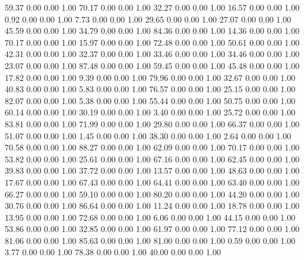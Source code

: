    59.37   0.00   0.00   1.00
   70.17   0.00   0.00   1.00
   32.27   0.00   0.00   1.00
   16.57   0.00   0.00   1.00
    0.92   0.00   0.00   1.00
    7.73   0.00   0.00   1.00
   29.65   0.00   0.00   1.00
   27.07   0.00   0.00   1.00
   45.59   0.00   0.00   1.00
   34.79   0.00   0.00   1.00
   84.36   0.00   0.00   1.00
   14.36   0.00   0.00   1.00
   70.17   0.00   0.00   1.00
   15.97   0.00   0.00   1.00
   72.48   0.00   0.00   1.00
   50.61   0.00   0.00   1.00
   42.31   0.00   0.00   1.00
   32.37   0.00   0.00   1.00
   33.46   0.00   0.00   1.00
   34.46   0.00   0.00   1.00
   23.07   0.00   0.00   1.00
   87.48   0.00   0.00   1.00
   59.45   0.00   0.00   1.00
   45.48   0.00   0.00   1.00
   17.82   0.00   0.00   1.00
    9.39   0.00   0.00   1.00
   79.96   0.00   0.00   1.00
   32.67   0.00   0.00   1.00
   40.83   0.00   0.00   1.00
    5.83   0.00   0.00   1.00
   76.57   0.00   0.00   1.00
   25.15   0.00   0.00   1.00
   82.07   0.00   0.00   1.00
    5.38   0.00   0.00   1.00
   55.44   0.00   0.00   1.00
   50.75   0.00   0.00   1.00
   60.14   0.00   0.00   1.00
   30.19   0.00   0.00   1.00
    3.40   0.00   0.00   1.00
   25.72   0.00   0.00   1.00
   83.81   0.00   0.00   1.00
   71.99   0.00   0.00   1.00
   29.80   0.00   0.00   1.00
   66.37   0.00   0.00   1.00
   51.07   0.00   0.00   1.00
    1.45   0.00   0.00   1.00
   38.30   0.00   0.00   1.00
    2.64   0.00   0.00   1.00
   70.58   0.00   0.00   1.00
   88.27   0.00   0.00   1.00
   62.09   0.00   0.00   1.00
   70.17   0.00   0.00   1.00
   53.82   0.00   0.00   1.00
   25.61   0.00   0.00   1.00
   67.16   0.00   0.00   1.00
   62.45   0.00   0.00   1.00
   39.83   0.00   0.00   1.00
   37.72   0.00   0.00   1.00
   13.57   0.00   0.00   1.00
   48.63   0.00   0.00   1.00
   17.67   0.00   0.00   1.00
   67.43   0.00   0.00   1.00
   64.41   0.00   0.00   1.00
   63.40   0.00   0.00   1.00
   66.27   0.00   0.00   1.00
   59.10   0.00   0.00   1.00
   80.20   0.00   0.00   1.00
   44.20   0.00   0.00   1.00
   30.76   0.00   0.00   1.00
   86.64   0.00   0.00   1.00
   11.24   0.00   0.00   1.00
   18.78   0.00   0.00   1.00
   13.95   0.00   0.00   1.00
   72.68   0.00   0.00   1.00
    6.06   0.00   0.00   1.00
   44.15   0.00   0.00   1.00
   53.86   0.00   0.00   1.00
   32.85   0.00   0.00   1.00
   61.97   0.00   0.00   1.00
   77.12   0.00   0.00   1.00
   81.06   0.00   0.00   1.00
   85.63   0.00   0.00   1.00
   81.00   0.00   0.00   1.00
    0.59   0.00   0.00   1.00
    3.77   0.00   0.00   1.00
   78.38   0.00   0.00   1.00
   40.00   0.00   0.00   1.00
